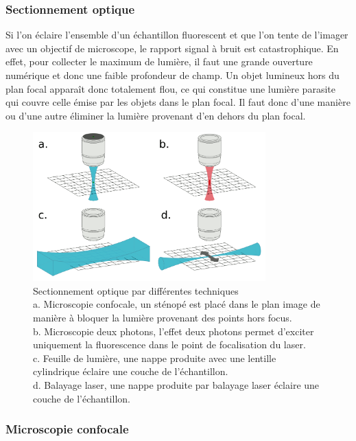 \subsubsection{Sectionnement optique}

Si l'on éclaire l'ensemble d'un échantillon fluorescent et que l'on tente de l'imager avec un objectif de microscope, le rapport signal à bruit est catastrophique. En effet, pour collecter le maximum de lumière, il faut une grande ouverture numérique et donc une faible profondeur de champ. Un objet lumineux hors du plan focal apparaît donc totalement flou, ce qui constitue une lumière parasite qui couvre celle émise par les objets dans le plan focal. Il faut donc d'une manière ou d'une autre éliminer la lumière provenant d'en dehors du plan focal.
 
\begin{figure}
  \centering
  \includegraphics[width=0.8\textwidth]{./files/optical_sectionning.svg.png}
  \caption{Sectionnement optique par différentes techniques \\
  a. Microscopie confocale, un sténopé est placé dans le plan image de manière à bloquer la lumière provenant des points hors focus. \\
  b. Microscopie deux photons, l'effet deux photons permet d'exciter uniquement la fluorescence dans le point de focalisation du laser. \\
  c. Feuille de lumière, une nappe produite avec une lentille cylindrique éclaire une couche de l'échantillon. \\
  d. Balayage laser, une nappe produite par balayage laser éclaire une couche de l'échantillon. \\
  }
  \end{figure}

\subsubsection{Microscopie confocale}

